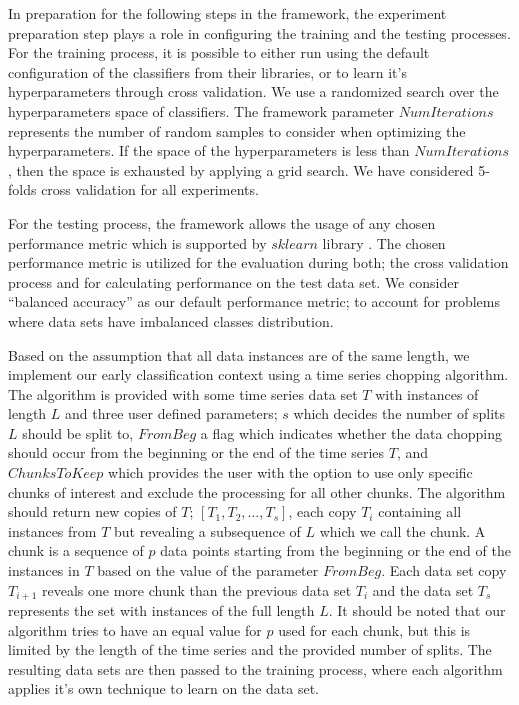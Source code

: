 In preparation for the following steps in the framework, the experiment preparation step plays a role in configuring the training and the testing processes.
For the training process, it is possible to either run using the default configuration of the classifiers from their libraries, or to learn it's hyperparameters through cross validation.
We use a randomized search over the hyperparameters space of classifiers.
The framework parameter $NumIterations$ represents the number of random samples to consider when optimizing the hyperparameters.
If the space of the hyperparameters is less than $NumIterations$, then the space is exhausted by applying a grid search. We have considered 5-folds cross validation for all experiments.

For the testing process, the framework allows the usage of any chosen performance metric which is supported by $sklearn$ library \cite{scikit-learn}.
The chosen performance metric is utilized for the evaluation during both; the cross validation process and for calculating performance on the test data set.
We consider \enquote{balanced accuracy} as our default performance metric; to account for problems where data sets have imbalanced classes distribution.

Based on the assumption that all data instances are of the same length, we implement our early classification context using a time series chopping algorithm.
The algorithm is provided with some time series data set $T$ with instances of length $L$ and three user defined parameters; $s$ which decides the number of splits $L$ should be split to,
$FromBeg$ a flag which indicates whether the data chopping should occur from the beginning or the end of the time series $T$, and $ChunksToKeep$ which provides the user
with the option to use only specific chunks of interest and exclude the processing for all other chunks.
The algorithm should return new copies of $T$; $[T_{1}, T_{2}, \ldots, T_{s}]$, each copy $T_{i}$ containing all instances from $T$ but revealing a subsequence of $L$
which we call the chunk. A chunk is a sequence of $p$ data points starting from the beginning or the end of the instances in $T$ based on the value of the parameter $FromBeg$.
Each data set copy $T_{i+1}$ reveals one more chunk than the previous data set $T_{i}$ and the data set $T_{s}$ represents the set with instances of the full length $L$.
It should be noted that our algorithm tries to have an equal value for $p$ used for each chunk, but this is limited by the length of the time series and the provided number of splits.
The resulting data sets are then passed to the training process, where each algorithm applies it's own technique to learn on the data set.

